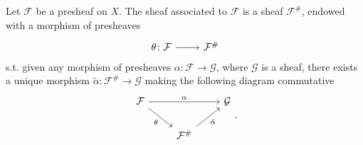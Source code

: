 \documentclass[../Main]{subfiles}
\begin{document}
\begin{defn}
	Let $\mathcal{F}$ be a presheaf on $X$.
	The sheaf associated to $\mathcal{F}$ is a sheaf $\mathcal{F}^\#$,
	endowed with a morphism of presheaves
	\begin{equation}
		\begin{tikzcd}
			\theta\colon \mathcal{F} \arrow[r, "", rightarrow] &
	\mathcal{F}^\#
		\end{tikzcd}
	\end{equation} 
	s.t. given any morphism of presheaves
	$\alpha\colon \mathcal{F} \to \mathcal{G}$, where $\mathcal{G}$ is a sheaf,
	there exists a unique morphism $\tilde{\alpha}\colon \mathcal{F}^\# \to \mathcal{G}$
	making the following diagram commutative
	\begin{equation}
	\begin{tikzcd}
		\mathcal{F} \arrow[rr, "\alpha", rightarrow] 
		\arrow[rd, "\theta"', rightarrow] & &
		\mathcal{G}\\
		&
		\mathcal{F}^\# \arrow[ru, "\tilde{\alpha}"', rightarrow] &
	\end{tikzcd}
	.\end{equation} 
\end{defn}
\end{document}
